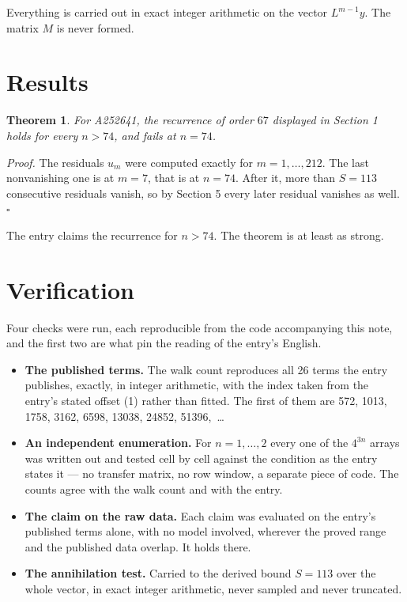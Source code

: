 \documentclass[11pt]{article}
\newtheorem{theorem}{Theorem}
\theoremstyle{definition}
\begin{document}
Everything is carried out in exact integer arithmetic on the vector $L^{m-1}y$. The matrix $M$ is never formed.

\section{Results}

\begin{theorem} For A252641, the recurrence of order $67$ displayed in Section 1 holds for every $n > 74$, and fails at $n = 74$.\end{theorem}

{\itshape Proof.} The residuals $u_m$ were computed exactly for $m = 1,\dots,212$. The last nonvanishing one is at $m = 7$, that is at $n = 74$. After it, more than $S = 113$ consecutive residuals vanish, so by Section 5 every later residual vanishes as well. $\square$

The entry claims the recurrence for $n > 74$. The theorem is at least as strong.

\section{Verification}

Four checks were run, each reproducible from the code accompanying this note, and the first two are what pin the reading of the entry's English.

\begin{itemize}

\item {\bfseries The published terms.} The walk count reproduces all 26 terms the entry publishes, exactly, in integer arithmetic, with the index taken from the entry's stated offset (1) rather than fitted. The first of them are 572, 1013, 1758, 3162, 6598, 13038, 24852, 51396,~\dots

\item {\bfseries An independent enumeration.} For $n = 1,\dots,2$ every one of the $4^{3n}$ arrays was written out and tested cell by cell against the condition as the entry states it --- no transfer matrix, no row window, a separate piece of code. The counts agree with the walk count and with the entry.

\item {\bfseries The claim on the raw data.} Each claim was evaluated on the entry's published terms alone, with no model involved, wherever the proved range and the published data overlap. It holds there.

\item {\bfseries The annihilation test.} Carried to the derived bound $S = 113$ over the whole vector, in exact integer arithmetic, never sampled and never truncated.

\end{itemize}
\end{document}
